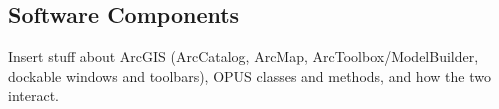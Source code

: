 \subsection{Software Components}
Insert stuff about ArcGIS (ArcCatalog, ArcMap, ArcToolbox/ModelBuilder, dockable windows and toolbars), OPUS classes and methods, and how the two interact.

